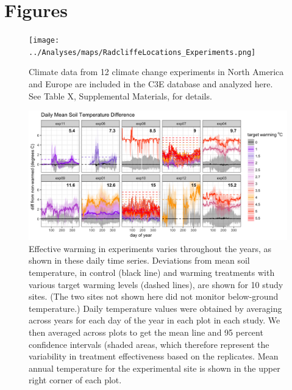 \documentclass{article}
\begin{document}
\section* {Figures}


\begin{figure}[p]
\centering
\texttt{[image: ../Analyses/maps/RadcliffeLocations\_Experiments.png]} 
\caption{Climate data from 12 climate change experiments in North America and Europe are included in the C3E database and analyzed here. See Table X, Supplemental Materials, for details.} 
 \label{fig:map}
 \end{figure}
\clearpage
\begin{figure}[h]
\centering
 \includegraphics{../Analyses/figures/Exploratory_TimeSeries_SoilTemp1Mean_Deviation.png}
 \caption{Effective warming in experiments varies throughout the years, as shown in these daily time series.  Deviations from mean soil temperature, in control (black line)
and warming treatments with various target warming levels (dashed lines), are shown for 10 study sites. (The two sites not shown here did not monitor below-ground temperature.) Daily temperature values were obtained by averaging across years for each day of the year in each plot in each study. We then averaged across plots to get the mean line and 95 percent confidence intervals (shaded areas, which therefore represent the variability in treatment effectiveness based on the replicates. Mean annual temperature for the experimental site is shown in the upper right corner of each plot.}
 \label{fig:effwarm}

 \end{figure}
\end{document}
